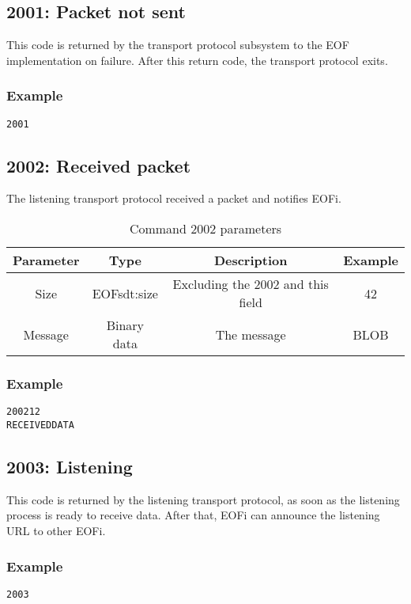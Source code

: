\documentclass[12pt,a4paper]{book}
\begin{document}
\subsection{2001: Packet not sent}
This code is returned by the transport protocol subsystem to the
EOF implementation on failure.
After this return code, the transport protocol exits.
\subsubsection{Example}
\begin{verbatim}
2001
\end{verbatim}
\subsection{2002: Received packet}
The listening transport protocol received a packet and notifies EOFi.
\begin{longtable}{|c|c|c|c|}
\caption{Command 2002 parameters}\\
\hline
\textbf{Parameter} & \textbf{Type} & \textbf{Description} & \textbf{Example}\\
\hline
Size & EOFsdt:size & Excluding the 2002 and this field & 42\\
\hline
Message & Binary data & The message & BLOB\\
\hline
\end{longtable}
\subsubsection{Example}
\begin{verbatim}
200212
RECEIVEDDATA
\end{verbatim}
\subsection{2003: Listening}
This code is returned by the listening transport protocol, as soon as the
listening process is ready to receive data. After that, EOFi can announce
the listening URL to other EOFi.
\subsubsection{Example}
\begin{verbatim}
2003
\end{verbatim}
\end{document}
